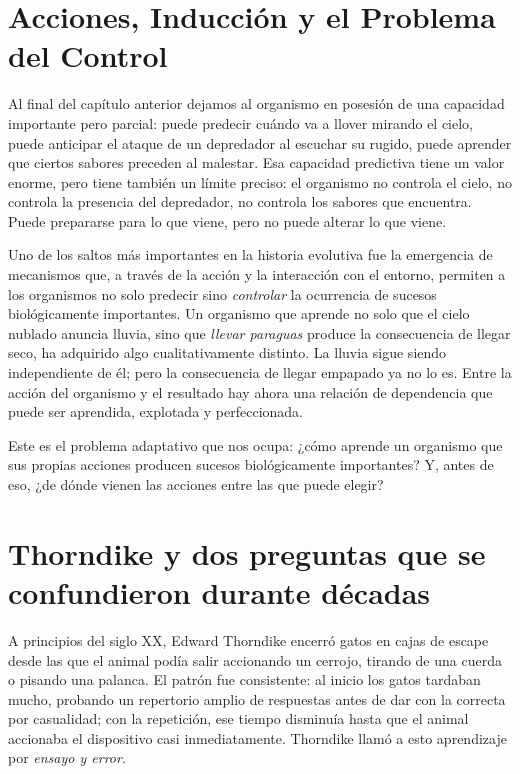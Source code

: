 \documentclass[
  letterpaper,
  DIV=11,
  numbers=noendperiod]{scrreprt}
\begin{document}
\begin{tcolorbox}[enhanced jigsaw, arc=.35mm, bottomrule=.15mm, breakable, colback=white, colframe=quarto-callout-note-color-frame, left=2mm, leftrule=.75mm, opacityback=0, rightrule=.15mm, toprule=.15mm]
\section{Acciones, Inducción y el Problema del
Control}\label{acciones-inducciuxf3n-y-el-problema-del-control}

Al final del capítulo anterior dejamos al organismo en posesión de una
capacidad importante pero parcial: puede predecir cuándo va a llover
mirando el cielo, puede anticipar el ataque de un depredador al escuchar
su rugido, puede aprender que ciertos sabores preceden al malestar. Esa
capacidad predictiva tiene un valor enorme, pero tiene también un límite
preciso: el organismo no controla el cielo, no controla la presencia del
depredador, no controla los sabores que encuentra. Puede prepararse para
lo que viene, pero no puede alterar lo que viene.

Uno de los saltos más importantes en la historia evolutiva fue la
emergencia de mecanismos que, a través de la acción y la interacción con
el entorno, permiten a los organismos no solo predecir sino
\emph{controlar} la ocurrencia de sucesos biológicamente importantes. Un
organismo que aprende no solo que el cielo nublado anuncia lluvia, sino
que \emph{llevar paraguas} produce la consecuencia de llegar seco, ha
adquirido algo cualitativamente distinto. La lluvia sigue siendo
independiente de él; pero la consecuencia de llegar empapado ya no lo
es. Entre la acción del organismo y el resultado hay ahora una relación
de dependencia que puede ser aprendida, explotada y perfeccionada.

Este es el problema adaptativo que nos ocupa: ¿cómo aprende un organismo
que sus propias acciones producen sucesos biológicamente importantes? Y,
antes de eso, ¿de dónde vienen las acciones entre las que puede elegir?

\section{Thorndike y dos preguntas que se confundieron durante
décadas}\label{thorndike-y-dos-preguntas-que-se-confundieron-durante-duxe9cadas}

A principios del siglo XX, Edward Thorndike encerró gatos en cajas de
escape desde las que el animal podía salir accionando un cerrojo,
tirando de una cuerda o pisando una palanca. El patrón fue consistente:
al inicio los gatos tardaban mucho, probando un repertorio amplio de
respuestas antes de dar con la correcta por casualidad; con la
repetición, ese tiempo disminuía hasta que el animal accionaba el
dispositivo casi inmediatamente. Thorndike llamó a esto aprendizaje por
\emph{ensayo y error}.


\end{tcolorbox}
\end{document}
